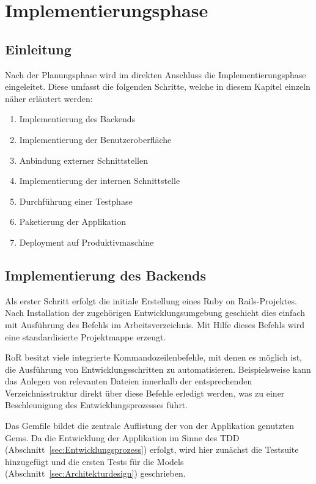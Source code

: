 
\section{Implementierungsphase}
\label{sec:Implementierungsphase}

\subsection{Einleitung}
\label{sec:Einleitung}
Nach der Planungsphase wird im direkten Anschluss die Implementierungsphase eingeleitet. Diese
umfasst die folgenden Schritte, welche in diesem Kapitel einzeln näher erläutert werden:
\begin{enumerate}
	\item Implementierung des Backends
	\item Implementierung der Benutzeroberfläche
	\item Anbindung externer Schnittstellen
	\item Implementierung der internen Schnittstelle
	\item Durchführung einer Testphase
	\item Paketierung der Applikation
	\item Deployment auf Produktivmaschine
\end{enumerate}

\subsection{Implementierung des Backends}
\label{sec:Implementierung des Backends}
Als erster Schritt erfolgt die initiale Erstellung eines Ruby on Rails-Projektes.
Nach Installation der zugehörigen Entwicklungsumgebung geschieht dies einfach mit Ausführung des
Befehls  im Arbeitsverzeichnis. Mit Hilfe dieses Befehls wird eine
standardisierte Projektmappe erzeugt.

RoR besitzt viele integrierte Kommandozeilenbefehle, mit denen es
möglich ist, die Ausführung von
Entwicklungsschritten zu automatisieren. Beispielsweise kann das Anlegen
von relevanten Dateien innerhalb der entsprechenden Verzeichnisstruktur
direkt über diese Befehle erledigt werden, was zu einer Beschleunigung
des Entwicklungsprozesses führt.

Das Gemfile bildet die zentrale Auflistung der von der Applikation genutzten Gems. Da die
Entwicklung der Applikation im Sinne des \acs{TDD} (\Vgl Abschnitt~\ref{sec:Entwicklungsprozess}) erfolgt,
wird hier zunächst die Testsuite  hinzugefügt und die ersten Tests für die Models
(\Vgl Abschnitt~\ref{sec:Architekturdesign}) geschrieben.

